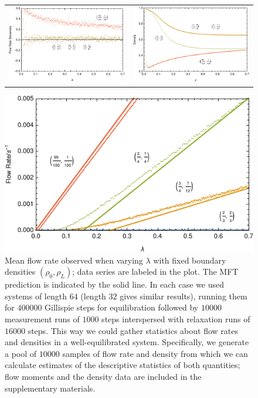 \begin{figure}[h!]
\begin{center}
\begin{tabular}{c|c}
    \hline
    \includegraphics[width=0.5\linewidth]{../tex-src/images/lambdaScan/newFlowSkew} & \includegraphics[width=0.5\linewidth]{../tex-src/images/lambdaScan/newDens} \\
    \end{tabular}
\end{center}
    \vspace{-0em}
\end{figure}
\fi
\begin{figure}[h!]
\vspace{1em}
\caption{\label{fig:lambdaScans} Mean flow rate observed when varying $\lambda$ with fixed boundary densities $(\rho_0, \rho_L)$; data series are labeled in the plot.
The MFT prediction is indicated by the solid line.
In each case we used systems of length $64$ (length $32$ gives similar results),
running them for $400000$ Gillispie steps for equilibration followed by $10000$ measurement runs of $1000$ steps interspersed with relaxation runs of $16000$
steps. This way we could gather statistics about flow rates and densities in a well-equilibrated system. Specifically, we generate a pool of $10000$ samples of flow rate and density
from which we can calculate estimates of the descriptive statistics of both quantities; flow moments and the density data are included in the supplementary materials.
\vspace{1em}}
\includegraphics[width=0.9\linewidth]{../tex-src/images/lambdaScan/newFlowMean}
    \vspace{-2em}
\end{figure}

